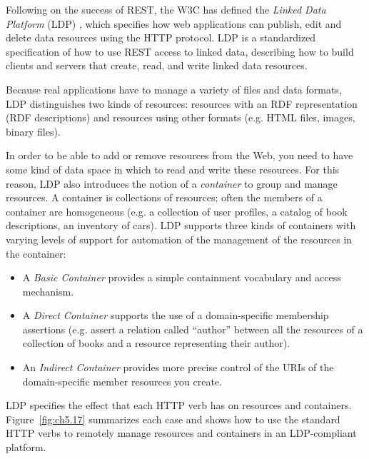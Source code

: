 Following on the success of REST, the W3C has defined the \emph{Linked Data Platform} (LDP) \cite{Speicher:15:LDP}, which
specifies how web applications can publish, edit and delete data
resources using the HTTP protocol. LDP is a standardized specification of how to use REST
access to linked data, describing how to build clients and servers that
create, read, and write linked data resources.

Because  real applications  have to manage a variety of files and
data formats, LDP distinguishes two kinds of resources: resources with
an RDF representation (RDF descriptions) and resources using other
formats (e.g. HTML files, images, binary files).

In order to be able to add or remove resources from the Web, you need to
have some kind of data space in which to read and write these resources.
For this reason, LDP also introduces the notion of a \emph{container} to
group and manage resources.  A container is collections of resources; often the members of a container
are  homogeneous  (e.g. a collection of user profiles, a catalog of
book descriptions, an inventory of cars). LDP supports three kinds of
containers with varying levels of support for automation of the management of 
the resources in the container:

\begin{itemize}
    \item A
\emph{Basic Container} provides a simple containment vocabulary and
access mechanism. 

\item A \emph{Direct Container} supports the use of a
domain-specific membership assertions (e.g. assert a relation called
``author'' between all the resources of a collection of books and a
resource representing their author).

\item An \emph{Indirect Container} provides more precise control of the URIs of the domain-specific member
resources you create.

\end{itemize} 

LDP specifies the effect that each HTTP verb has on resources and
containers. Figure~\ref{fig:ch5.17} summarizes each case and shows how to use the standard HTTP verbs to 
remotely manage
resources and containers in an LDP-compliant platform. 



